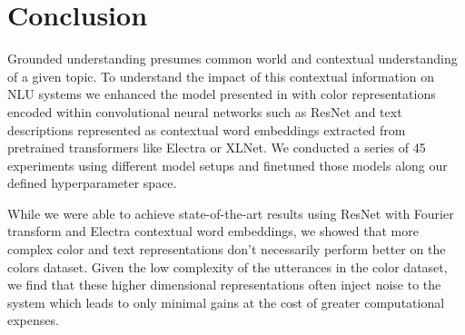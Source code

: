 \section{Conclusion}

Grounded understanding presumes common world and contextual understanding of a given topic. To understand the impact of this contextual information on NLU systems we enhanced the model presented in \citep{monroe-2017-colors} with color representations encoded within convolutional neural networks such as ResNet and text descriptions represented as contextual word embeddings extracted from pretrained transformers like Electra or XLNet. We conducted a series of 45 experiments using different model setups and finetuned those models along our defined hyperparameter space.

\par
While we were able to achieve state-of-the-art results using ResNet with Fourier transform and Electra contextual word embeddings, we showed that more complex color and text representations don’t necessarily perform better on the colors dataset. Given the low complexity of the utterances in the color dataset, we find that these higher dimensional representations often inject noise to the system which leads to only minimal gains at the cost of greater computational expenses.

